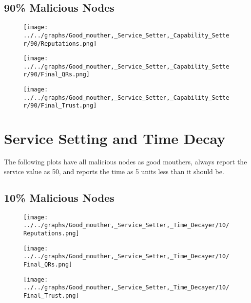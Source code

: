 \begin{minipage}[t]{0.49\columnwidth}
\subsection*{90\% Malicious Nodes}
    \begin{figure}[H]
        \centering
        \texttt{[image: ../../graphs/Good\_mouther,\_Service\_Setter,\_Capability\_Setter/90/Reputations.png]}
    \end{figure}
    \begin{figure}[H]
        \centering
        \texttt{[image: ../../graphs/Good\_mouther,\_Service\_Setter,\_Capability\_Setter/90/Final\_QRs.png]}
    \end{figure}
\end{minipage}
\begin{minipage}[t]{0.49\columnwidth}
    \begin{figure}[H]
        \centering
        \texttt{[image: ../../graphs/Good\_mouther,\_Service\_Setter,\_Capability\_Setter/90/Final\_Trust.png]}
    \end{figure}
\end{minipage}
\newpage

\section*{Service Setting and Time Decay}
The following plots have all malicious nodes as good mouthers, always
report the service value as 50, and reports the time as 5 units less than
it should be.
\\
\begin{minipage}[t]{0.49\columnwidth}
\subsection*{10\% Malicious Nodes}
    \begin{figure}[H]
        \centering
        \texttt{[image: ../../graphs/Good\_mouther,\_Service\_Setter,\_Time\_Decayer/10/Reputations.png]}
    \end{figure}
    \begin{figure}[H]
        \centering
        \texttt{[image: ../../graphs/Good\_mouther,\_Service\_Setter,\_Time\_Decayer/10/Final\_QRs.png]}
    \end{figure}
\end{minipage}
\begin{minipage}[t]{0.49\columnwidth}
    \begin{figure}[H]
        \centering
        \texttt{[image: ../../graphs/Good\_mouther,\_Service\_Setter,\_Time\_Decayer/10/Final\_Trust.png]}
    \end{figure}
\end{minipage}

